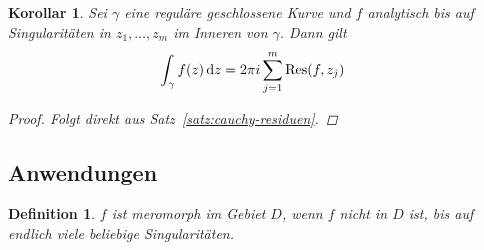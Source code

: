 \documentclass[11pt, a4paper]{article}
\theoremstyle{plain}
\newtheorem{definition}[blockelement]{Definition}
\newtheorem{korollar}[blockelement]{Korollar}
\numberwithin{equation}{subsection}
\newcommand{\of}[1]{\mathopen{}\mathclose{}\bgroup\left(#1\aftergroup\egroup\right)}
\newcommand{\dif}{\mathop{}\!\mathrm{d}}
\DeclareMathOperator{\Res}{Res}
\begin{document}
    \begin{korollar}
        Sei $\gamma$ eine reguläre geschlossene Kurve und $f$ analytisch bis auf Singularitäten in $z_1, \ldots, z_m$ im Inneren von $\gamma$. Dann gilt
        \begin{align*}
            \int_{\gamma}^{} f\of{z} \dif z &= 2\pi i \sum_{j=1}^{m} \Res\of{f, z_j}
        \end{align*}
        \begin{proof}
            Folgt direkt aus Satz~\ref{satz:cauchy-residuen}.
        \end{proof}
    \end{korollar}

    \subsection{Anwendungen}

    \begin{definition} %
        $f$ ist meromorph im Gebiet $D$, wenn $f$ nicht in $D$ ist, bis auf endlich viele beliebige Singularitäten.
    \end{definition}
\end{document}
